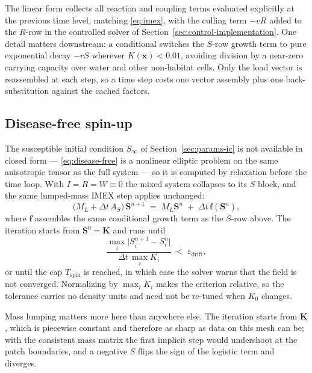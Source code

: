 \documentclass[11pt]{article}
\begin{document}
The linear form collects all reaction and coupling terms evaluated explicitly at the previous time level, matching \eqref{eq:imex}, with the culling term $-vR$ added to the $R$-row in the controlled solver of Section~\ref{sec:control-implementation}. One detail matters downstream: a conditional switches the $S$-row growth term to pure exponential decay $-rS$ wherever $K(\mathbf{x})<0.01$, avoiding division by a near-zero carrying capacity over water and other non-habitat cells. Only the load vector is reassembled at each step, so a time step costs one vector assembly plus one back-substitution against the cached factors.

\subsection{Disease-free spin-up}
\label{sec:spinup}

The susceptible initial condition $S_\infty$ of Section~\ref{sec:params-ic} is not available in closed form --- \eqref{eq:disease-free} is a nonlinear elliptic problem on the same anisotropic tensor as the full system --- so it is computed by relaxation before the time loop. With $I=R=W\equiv0$ the mixed system collapses to its $S$ block, and the same lumped-mass IMEX step applies unchanged:
\begin{equation}
\big(M_L + \Delta t\,A_S\big)\,\mathbf{S}^{n+1} \;=\; M_L\mathbf{S}^{n} \;+\; \Delta t\,\mathbf{f}(\mathbf{S}^n),
\label{eq:spinup-step}
\end{equation}
where $\mathbf{f}$ assembles the same conditional growth term as the $S$-row above. The iteration starts from $\mathbf{S}^0 = \mathbf{K}$ and runs until
\begin{equation}
\frac{\max_i\big|S_i^{n+1}-S_i^{n}\big|}{\Delta t\,\max_i K_i} \;<\; \varepsilon_{\text{drift}},
\label{eq:spinup-stop}
\end{equation}
or until the cap $T_{\text{spin}}$ is reached, in which case the solver warns that the field is not converged. Normalizing by $\max_i K_i$ makes the criterion relative, so the tolerance carries no density units and need not be re-tuned when $K_0$ changes.

Mass lumping matters more here than anywhere else. The iteration starts from $\mathbf{K}$, which is piecewise constant and therefore as sharp as data on this mesh can be; with the consistent mass matrix the first implicit step would undershoot at the patch boundaries, and a negative $S$ flips the sign of the logistic term and diverges.
\end{document}
